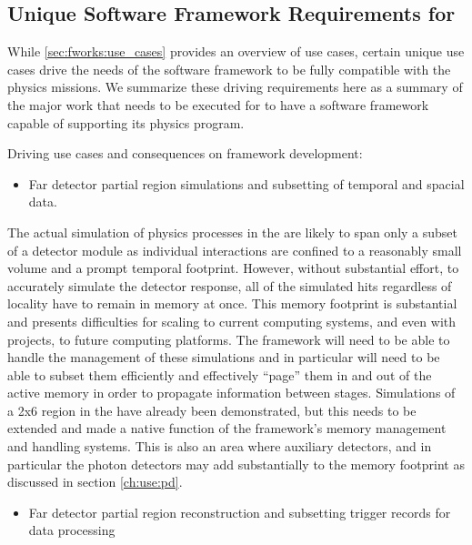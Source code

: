 \documentclass[../main-v1.tex]{subfiles}
\begin{document}
\subsection{Unique Software Framework Requirements for }

While \ref{sec:fworks:use_cases} provides an overview of use cases, certain unique use cases drive the needs of the  software framework to be fully compatible with the physics missions.   We summarize these driving requirements here as a summary of the major work that needs to be executed for  to have a software framework capable of supporting its physics program.


Driving use cases and consequences on framework development:


\begin{itemize}
\item Far detector partial region simulations and subsetting of temporal and spacial data.
\end{itemize}

The actual simulation of physics processes in the  are likely to span only a subset of a detector module as individual interactions are confined to a reasonably small volume and a prompt temporal footprint.  However, without substantial effort, to accurately simulate the detector response, all of the simulated hits regardless of locality have to remain in memory at once.  This memory footprint is substantial and presents difficulties for scaling to current computing systems, and even with projects, to future computing platforms.  The framework will need to be able to handle the management of these simulations and in particular will need to be able to subset them efficiently and effectively ``page'' them in and out of the active memory in order to propagate information between stages.  Simulations of a 2x6  region in the  have already been demonstrated, but this needs to be extended and made a native function of the framework's memory management and handling systems.  This is also an area where auxiliary detectors, and in particular the photon detectors may add substantially to the memory footprint as discussed in section \ref{ch:use:pd}. 


\begin{itemize}
\item Far detector partial region reconstruction and subsetting trigger records for data processing
\end{itemize}
\end{document}
